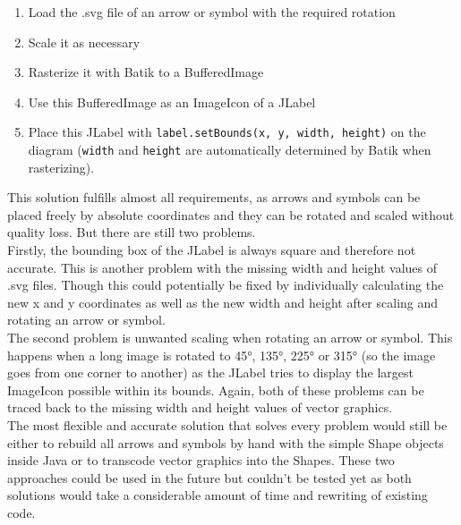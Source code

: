 \begin{enumerate}[label=\textbf{\arabic*}.]
	\item Load the .svg file of an arrow or symbol with the required rotation
	\item Scale it as necessary
	\item Rasterize it with Batik to a BufferedImage
	\item Use this BufferedImage as an ImageIcon of a JLabel
	\item Place this JLabel with \texttt{label.setBounds(x, y, width, height)}  on the diagram (\texttt{width} and \texttt{height} are automatically determined by Batik when rasterizing).
\end{enumerate}
This solution fulfills almost all requirements, as arrows and symbols can be placed freely by absolute coordinates and they can be rotated and scaled without quality loss. But there are still two problems.\\
Firstly, the bounding box of the JLabel is always square and therefore not accurate. This is another problem with the missing width and height values of .svg files. Though this could potentially be fixed by individually calculating the new x and y coordinates as well as the new width and height after scaling and rotating an arrow or symbol.\\
The second problem is unwanted scaling when rotating an arrow or symbol. This happens when a long image is rotated to 45°, 135°, 225° or 315° (so the image goes from one corner to another) as the JLabel tries to display the largest ImageIcon possible within its bounds. Again, both of these problems can be traced back to the missing width and height values of vector graphics.\\
The most flexible and accurate solution that solves every problem would still be either to rebuild all arrows and symbols by hand with the simple Shape objects inside Java or to transcode vector graphics into the Shapes. These two approaches could be used in the future but couldn't be tested yet as both solutions would take a considerable amount of time and rewriting of existing code.

